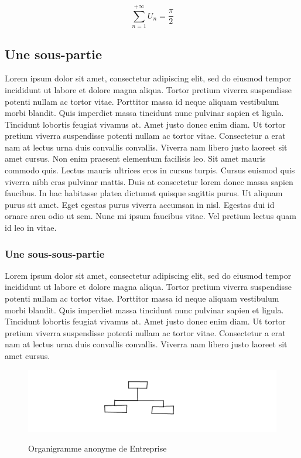 \[
	\sum_{n=1}^{+\infty} U_n = \frac{\pi}{2}
\]

\subsection{Une sous-partie}

Lorem ipsum dolor sit amet, consectetur adipiscing elit, sed do eiusmod
tempor incididunt ut labore et dolore magna aliqua. Tortor pretium
viverra suspendisse potenti nullam ac tortor vitae. Porttitor massa id
neque aliquam vestibulum morbi blandit. Quis imperdiet massa tincidunt
nunc pulvinar sapien et ligula. Tincidunt lobortis feugiat vivamus
at. Amet justo donec enim diam. Ut tortor pretium viverra suspendisse
potenti nullam ac tortor vitae. Consectetur a erat nam at lectus urna
duis convallis convallis. Viverra nam libero justo laoreet sit amet
cursus. Non enim praesent elementum facilisis leo. Sit amet mauris
commodo quis. Lectus mauris ultrices eros in cursus turpis. Cursus euismod
quis viverra nibh cras pulvinar mattis. Duis at consectetur lorem donec
massa sapien faucibus. In hac habitasse platea dictumst quisque sagittis
purus. Ut aliquam purus sit amet. Eget egestas purus viverra accumsan
in nisl. Egestas dui id ornare arcu odio ut sem. Nunc mi ipsum faucibus
vitae. Vel pretium lectus quam id leo in vitae.

\subsubsection{Une sous-sous-partie}

Lorem ipsum dolor sit amet, consectetur adipiscing elit, sed do eiusmod
tempor incididunt ut labore et dolore magna aliqua. Tortor pretium
viverra suspendisse potenti nullam ac tortor vitae. Porttitor massa id
neque aliquam vestibulum morbi blandit. Quis imperdiet massa tincidunt
nunc pulvinar sapien et ligula. Tincidunt lobortis feugiat vivamus
at. Amet justo donec enim diam. Ut tortor pretium viverra suspendisse
potenti nullam ac tortor vitae. Consectetur a erat nam at lectus urna
duis convallis convallis. Viverra nam libero justo laoreet sit amet
cursus.

\begin{figure}[h]
	\centering
	\includegraphics[width=1.0\textwidth]{graphics/organigramme}
	\label{organigramme}
	\caption{Organigramme anonyme de Entreprise \protect\footnotemark}
\end{figure}

